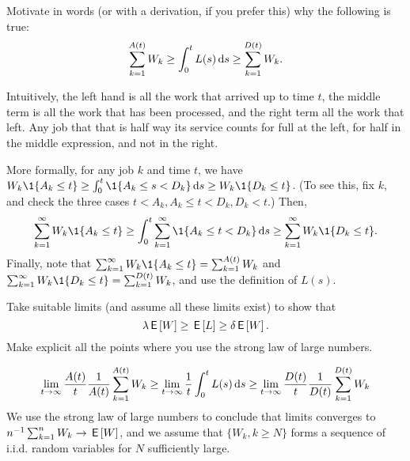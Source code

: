\begin{exercise}
 Motivate in words (or with a derivation, if you prefer this) why the following is true:
 \begin{equation*}
 \sum_{k=1}^{A(t)} W_k \geq \int_0^t L(s) \,\text{d}s \geq \sum_{k=1}^{D(t)} W_k.
 \end{equation*}
\begin{solution}
 Intuitively, the left hand is all the work that arrived up to time $t$, the middle term is all the work that has been processed, and the right term all the work that left.
 Any job that that is half way its service counts for full at the left, for half in the middle expression, and not in the right.

 More formally, for any job $k$ and time $t$, we have $W_k \1{A_k \leq t} \geq \int_0^t \1{A_k \leq s < D_k } \d s \geq W_k \1{D_k \leq t}$. (To see this, fix $k$, and check the three cases $t < A_k, A_k \leq t < D_k, D_k < t$.) Then,
 \begin{equation*}
 \sum_{k=1}^\infty W_k \1{A_k \leq t} \geq \int_0^t \sum_{k=1}^\infty \1{A_k \leq t < D_k} \d s \geq \sum_{k=1}^\infty W_k \1{D_k \leq t}. 
 \end{equation*}
 Finally, note that $ \sum_{k=1}^\infty W_k \1{A_k \leq t} = \sum_{k=1}^{A(t)} W_k$ and $ \sum_{k=1}^\infty W_k \1{D_k \leq t} = \sum_{k=1}^{D(t)} W_k$, and use the definition of $L(s)$.
\end{solution}
\end{exercise}

\begin{exercise}
Take suitable limits (and assume all these limits exist) to show that 
 \begin{equation*}
\lambda \,\mathsf{E}\left[W\right] \geq \,\mathsf{E}\left[L\right] \geq \delta \,\mathsf{E}\left[W\right].
 \end{equation*}
 Make explicit all the points where you use the strong law of large numbers.
\begin{solution}
 \begin{equation*}
 \lim_{t\to\infty} \frac{A(t)}{t}\frac 1{A(t)}\sum_{k=1}^{A(t)} W_k \geq \lim_{t\to \infty} \frac 1 t \int_0^t L(s) \,\text{d}s \geq \lim_{t\to\infty} \frac{D(t)}{t}\frac 1{D(t)} \sum_{k=1}^{D(t)} W_k 
 \end{equation*}
 We use the strong law of large numbers to conclude that limits converges to $n^{-1} \sum_{k=1}^n W_k \to \,\mathsf{E}\left[W\right]$, and we assume that $\{W_k, k\geq N\}$ forms a sequence of i.i.d.
 random variables for $N$ sufficiently large.
\end{solution}
\end{exercise}


